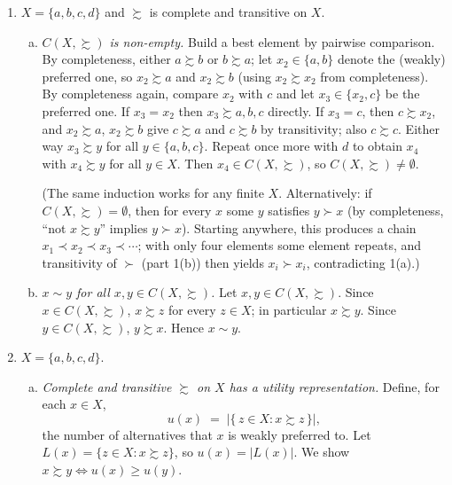\documentclass[12pt]{article}
\newcommand{\pref}{\succsim}
\newcommand{\C}{C(X,\pref)}
\begin{document}
\begin{enumerate}
\begin{enumerate}[(a)]
\item \emph{If $x \succ y$ and $y \pref z$, then $x \succ z$.}
From $x \pref y$ and $y \pref z$, transitivity gives $x \pref z$. Suppose $z \pref x$. Then $y \pref z$ and $z \pref x$ give $y \pref x$ by transitivity, contradicting $x \succ y$. Hence not $z \pref x$, so $x \succ z$.
\end{enumerate}

\item $X=\{a,b,c,d\}$ and $\pref$ is complete and transitive on $X$.

\begin{enumerate}[(a)]
\item \emph{$\C$ is non-empty.}
Build a best element by pairwise comparison. By completeness, either $a \pref b$ or $b \pref a$; let $x_2 \in \{a,b\}$ denote the (weakly) preferred one, so $x_2 \pref a$ and $x_2 \pref b$ (using $x_2 \pref x_2$ from completeness). By completeness again, compare $x_2$ with $c$ and let $x_3 \in \{x_2, c\}$ be the preferred one. If $x_3 = x_2$ then $x_3 \pref a,b,c$ directly. If $x_3 = c$, then $c \pref x_2$, and $x_2 \pref a$, $x_2 \pref b$ give $c \pref a$ and $c \pref b$ by transitivity; also $c \pref c$. Either way $x_3 \pref y$ for all $y \in \{a,b,c\}$. Repeat once more with $d$ to obtain $x_4$ with $x_4 \pref y$ for all $y \in X$. Then $x_4 \in \C$, so $\C \neq \emptyset$.

(The same induction works for any finite $X$. Alternatively: if $\C = \emptyset$, then for every $x$ some $y$ satisfies $y \succ x$ (by completeness, ``not $x \pref y$'' implies $y \succ x$). Starting anywhere, this produces a chain $x_1 \prec x_2 \prec x_3 \prec \cdots$; with only four elements some element repeats, and transitivity of $\succ$ (part 1(b)) then yields $x_i \succ x_i$, contradicting 1(a).)

\item \emph{$x \sim y$ for all $x,y \in \C$.}
Let $x,y \in \C$. Since $x \in \C$, $x \pref z$ for every $z \in X$; in particular $x \pref y$. Since $y \in \C$, $y \pref x$. Hence $x \sim y$.
\end{enumerate}

\item $X=\{a,b,c,d\}$.

\begin{enumerate}[(a)]
\item \emph{Complete and transitive $\pref$ on $X$ has a utility representation.}
Define, for each $x \in X$,
\[
u(x) \;=\; \big|\{\, z \in X : x \pref z \,\}\big|,
\]
the number of alternatives that $x$ is weakly preferred to. Let $L(x) = \{z \in X : x \pref z\}$, so $u(x)=|L(x)|$. We show $x \pref y \iff u(x) \ge u(y)$.


\end{enumerate}
\end{enumerate}
\end{document}
